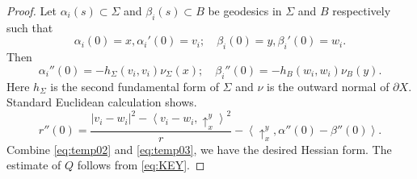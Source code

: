 \documentclass[10pt,a4paper]{amsart}
\begin{document}
\begin{proof}
	Let $\alpha_{i}(s)\subset \Sigma$ and $\beta_{i}(s)\subset B$ be geodesics in $\Sigma$ and $B$ respectively such that
	\begin{equation*}
	\alpha_{i}(0)=x, \alpha_{i}'(0)=v_{i}; \quad \beta_{i}(0)=y, \beta_{i}'(0)=w_{i}.
	\end{equation*}
	Then
	\begin{equation}\label{eq:temp02}
	\alpha_{i}''(0)=-h_{\Sigma}(v_{i}, v_{i}) \nu_{\Sigma}(x);\quad \beta_{i}''(0)=-h_{B}(w_{i}, w_{i})\nu_{B}(y).
	\end{equation}
	Here $h_{\Sigma}$ is the second fundamental form of $\Sigma$ and $\nu$ is the outward normal of $\partial X$. Standard Euclidean calculation shows.
	\begin{equation}\label{eq:temp03}
		r''(0) = \frac{|v_{i}-w_{i}|^{2} - \left\langle v_{i}-w_{i}, \uparrow_{x}^{y} \right\rangle ^{2}}{r} 
		- \left\langle \uparrow_{x}^{y}, \alpha''(0)-\beta''(0) \right\rangle.
	\end{equation}
	Combine \eqref{eq:temp02} and \eqref{eq:temp03}, we have the desired Hessian form. The estimate of $Q$ follows from \eqref{eq:KEY}.
\end{proof}
\end{document}
